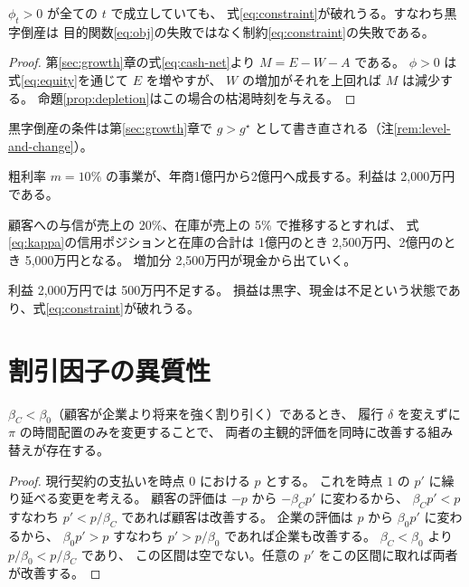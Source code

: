 \begin{corollary}[黒字倒産]
\label{cor:insolvency-with-profit}
$\phi_t>0$ が全ての $t$ で成立していても、
式\eqref{eq:constraint}が破れうる。すなわち黒字倒産は
目的関数\eqref{eq:obj}の失敗ではなく制約\eqref{eq:constraint}の失敗である。
\end{corollary}

\begin{proof}
第\ref{sec:growth}章の式\eqref{eq:cash-net}より $M=E-W-A$ である。
$\phi>0$ は式\eqref{eq:equity}を通じて $E$ を増やすが、
$W$ の増加がそれを上回れば $M$ は減少する。
命題\ref{prop:depletion}はこの場合の枯渇時刻を与える。
\end{proof}

黒字倒産の条件は第\ref{sec:growth}章で $g>g^\star$ として書き直される（注\ref{rem:level-and-change}）。

\begin{example}[黒字倒産の数値例]
\label{ex:insolvency}
粗利率 $m=10\%$ の事業が、年商1億円から2億円へ成長する。利益は 2,000万円である。

顧客への与信が売上の 20\%、在庫が売上の 5\% で推移するとすれば、
式\eqref{eq:kappa}の信用ポジションと在庫の合計は
1億円のとき 2,500万円、2億円のとき 5,000万円となる。
増加分 2,500万円が現金から出ていく。

利益 2,000万円では 500万円不足する。
損益は黒字、現金は不足という状態であり、式\eqref{eq:constraint}が破れうる。
\end{example}

\section{割引因子の異質性}

\begin{proposition}[決済スケジュールの組み替え利得]
\label{prop:discount}
$\beta_C<\beta_0$（顧客が企業より将来を強く割り引く）であるとき、
履行 $\delta$ を変えずに $\pi$ の時間配置のみを変更することで、
両者の主観的評価を同時に改善する組み替えが存在する。
\end{proposition}

\begin{proof}
現行契約の支払いを時点 $0$ における $p$ とする。
これを時点 $1$ の $p'$ に繰り延べる変更を考える。
顧客の評価は $-p$ から $-\beta_C p'$ に変わるから、
$\beta_C p' < p$ すなわち $p' < p/\beta_C$ であれば顧客は改善する。
企業の評価は $p$ から $\beta_0 p'$ に変わるから、
$\beta_0 p' > p$ すなわち $p' > p/\beta_0$ であれば企業も改善する。
$\beta_C<\beta_0$ より $p/\beta_0 < p/\beta_C$ であり、
この区間は空でない。任意の $p'$ をこの区間に取れば両者が改善する。
\end{proof}


